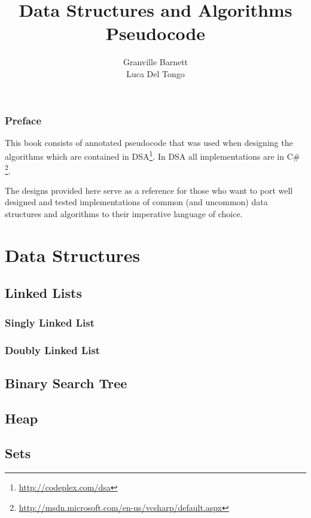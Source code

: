 \documentclass[10pt,oneside,a4paper]{report}
\begin{document}
\title{Data Structures and Algorithms\\Pseudocode}
\author{Granville Barnett\\Luca Del Tongo}
\maketitle

\newpage
\tableofcontents
\newpage

\section*{Preface}
This book consists of annotated pseudocode that was used when designing the algorithms which are contained in DSA\footnote{\url{http://codeplex.com/dsa}}. In DSA all implementations are in C\# \footnote{\url{http://msdn.microsoft.com/en-us/vcsharp/default.aspx}}.

The designs provided here serve as a reference for those who want to port well designed and tested implementations of common (and uncommon) data structures and algorithms to their imperative language of choice.

\pagestyle{headings}

\part{Data Structures}

\chapter{Linked Lists}
\section{Singly Linked List}
\section{Doubly Linked List}

\chapter{Binary Search Tree}

\chapter{Heap}

\chapter{Sets}
\end{document}
